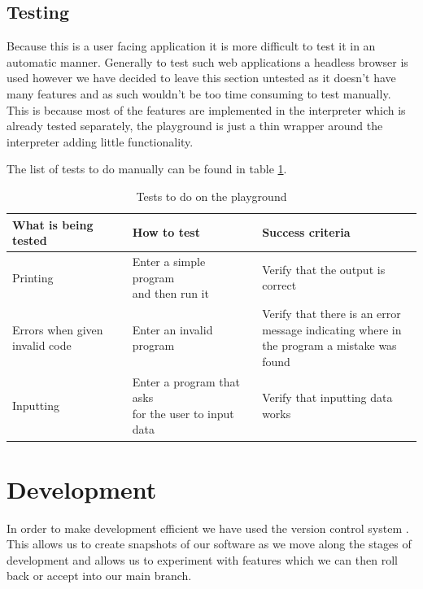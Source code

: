 \documentclass{article}
\begin{document}
\subsection{Testing}

Because this is a user facing application it is more difficult to test it in an
automatic manner. Generally to test such web applications a headless browser is
used however we have decided to leave this section untested as it doesn't have
many features and as such wouldn't be too time consuming to test manually. This
is because most of the features are implemented in the interpreter which is
already tested separately, the playground is just a thin wrapper around the
interpreter adding little functionality.

The list of tests to do manually can be found in table
\ref{tbl:playground_tests}.

\begin{table}
	\begin{adjustbox}{center}
	\begin{tabular}{|l|l|l|}
		\hline
		What is being tested & How to test & Success criteria \\
		\hline
		Printing & \makecell[ll]{Enter a simple program \\ and then run it} & Verify that the
		output is correct \\
		\hline
		\makecell[ll]{Errors when given \\ invalid code} & Enter an invalid program &
		\makecell[ll]{Verify that there is an error \\ message indicating where
		in \\ the program a mistake was found} \\
		\hline
		Inputting & \makecell[ll]{Enter a program that asks \\ for the user to
		input data} &
		Verify that inputting data works \\
		\hline
	\end{tabular}
	\end{adjustbox}
	\caption{Tests to do on the playground}
	\label{tbl:playground_tests}
\end{table}

\section{Development}

In order to make development efficient we have used the version control system
. This allows us to create snapshots of our software as we move
along the stages of development and allows us to experiment with features which
we can then roll back or accept into our main branch.
\end{document}
